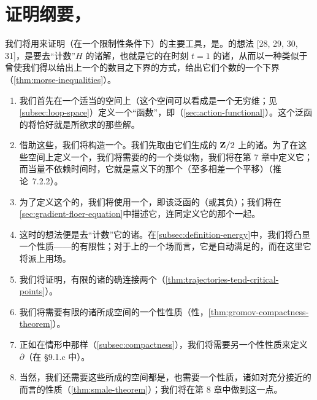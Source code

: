 
\section{证明纲要，\trFloerHomology}
\label{sec:outline-floer-homology}

我们将用来证明\trArnoldConjecture（在一个限制性条件下）的主要工具，是\trFloerHomology。\trFloer{}的想法 [28, 29, 30, 31]，是要去“计数”$H$ 的诸\trPeriodic{}解，也就是它的\trFlow{}在时刻 $t=1$ 的诸\trFixedPoint，从而以一种类似于曾使我们得以给出\trManifold{}上一个\trMorseFunction{}的\trCriticalPoint{}数目之下界的方式，给出它们个数的一个下界（\cref{thm:morse-inequalities}）。

\begin{enumerate}[label=(\arabic*)]
\item 我们首先在一个适当的空间上（这个空间可以看成是一个无穷维\trManifold；见\cref{subsec:loop-space}）定义一个“函数”，即\textbf{\trActionFunctional}（\cref{sec:action-functional}）。这个泛函的\trCriticalPoint{}将恰好就是所欲求的那些\trPeriodic{}解。
\item 借助这些\trCriticalPoint，我们将构造一个\trComplex。我们先取由它们生成的 $\mathbf{Z}/2$ 上的诸\trVectorSpace。为了在这些空间上定义一个\trGraded，我们将需要\trCriticalPoint{}的\trIndex{}的一个类似物，我们将在第 7 章中定义它；而当\trHamiltonian{}量不依赖时间时，它就是\trMorse{}意义下的那个\trIndex（至多相差一个平移）（推论~7.2.2）。
\item 为了定义这个\trComplex{}的\trDifferential，我们将使用一个\trVectorField，即该泛函的\trGradient（或其负）；我们将在\cref{sec:gradient-floer-equation}中描述它，连同定义它的那个\trMetric{}一起。
\item 这时的想法便是去“计数”它的诸\trTrajectory。在\cref{subsec:definition-energy}中，我们将凸显一个性质——\trEnergy{}的有限性；对于\trCompact\trManifold{}上的一个\trPseudogradient{}场而言，它是自动满足的，而在这里它将派上用场。
\item 我们将证明，有限\trEnergy{}的诸\trTrajectory{}的确连接两个\trCriticalPoint（\cref{thm:trajectories-tend-critical-points}）。
\item 我们将需要有限\trEnergy{}的诸\trTrajectory{}所成空间的一个\trCompact{}性性质（\trGromov{}\trCompact{}性，\cref{thm:gromov-compactness-theorem}）。
\item 正如在\trMorse{}情形中那样（\cref{subsec:compactness}），我们将需要另一个\trCompact{}性性质来定义\trDifferential{} $\partial$（在 §9.1.c 中）。
\item 当然，我们还需要这些\trTrajectory{}所成的空间都是\trManifold，也需要一个\trGenericity{}性质，诸如对充分接近的\trVectorField{}而言的\trSmale{}性质（\cref{thm:smale-theorem}）；我们将在第 8 章中做到这一点。

\end{enumerate}
